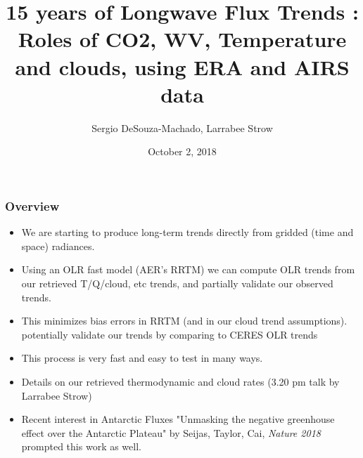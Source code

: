 \documentclass[10pt,t]{beamer}
\begin{document}
\title[]{15 years of Longwave Flux Trends : \newline
  Roles of CO2, WV, Temperature and clouds, \newline
  using ERA and AIRS data}
\author{Sergio DeSouza-Machado, Larrabee Strow}
\date{October 2, 2018}
\begin{frame}
  \titlepage
\end{frame}
\begin{frame}
  \frametitle{Overview}
  \begin{itemize}
  \item We are starting to produce long-term trends directly from gridded (time and space) radiances.
  \item Using an OLR fast model (AER's RRTM) we can compute OLR trends from our retrieved T/Q/cloud, etc trends, and partially validate our observed trends.
  \item This minimizes bias errors in RRTM (and in our cloud trend assumptions).
    potentially validate our trends by comparing to CERES OLR trends
  \item This process is very fast and easy to test in many ways.
    \item Details on our retrieved thermodynamic and cloud rates (3.20 pm talk by Larrabee Strow)
  \item Recent interest in Antarctic Fluxes "Unmasking the negative greenhouse effect over the Antarctic Plateau" by Seijas, Taylor, Cai, \emph{Nature 2018} prompted this work as well.
  \end{itemize}
\end{frame}
\end{document}
